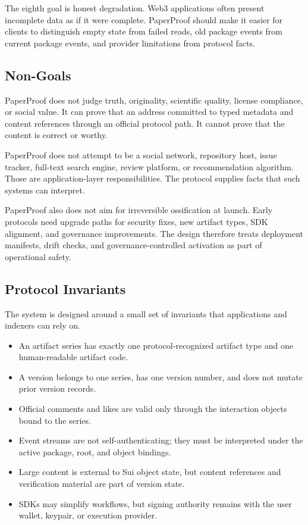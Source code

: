 \documentclass[journal]{IEEEtran}
\begin{document}
The eighth goal is honest degradation. Web3 applications often present incomplete data as if it were complete. PaperProof should make it easier for clients to distinguish empty state from failed reads, old package events from current package events, and provider limitations from protocol facts.

\subsection{Non-Goals}

PaperProof does not judge truth, originality, scientific quality, license compliance, or social value. It can prove that an address committed to typed metadata and content references through an official protocol path. It cannot prove that the content is correct or worthy.

PaperProof does not attempt to be a social network, repository host, issue tracker, full-text search engine, review platform, or recommendation algorithm. Those are application-layer responsibilities. The protocol supplies facts that such systems can interpret.

PaperProof also does not aim for irreversible ossification at launch. Early protocols need upgrade paths for security fixes, new artifact types, SDK alignment, and governance improvements. The design therefore treats deployment manifests, drift checks, and governance-controlled activation as part of operational safety.

\subsection{Protocol Invariants}

The system is designed around a small set of invariants that applications and indexers can rely on.

\begin{itemize}
    \item An artifact series has exactly one protocol-recognized artifact type and one human-readable artifact code.
    \item A version belongs to one series, has one version number, and does not mutate prior version records.
    \item Official comments and likes are valid only through the interaction objects bound to the series.
    \item Event streams are not self-authenticating; they must be interpreted under the active package, root, and object bindings.
    \item Large content is external to Sui object state, but content references and verification material are part of version state.
    \item SDKs may simplify workflows, but signing authority remains with the user wallet, keypair, or execution provider.
\end{itemize}
\end{document}
